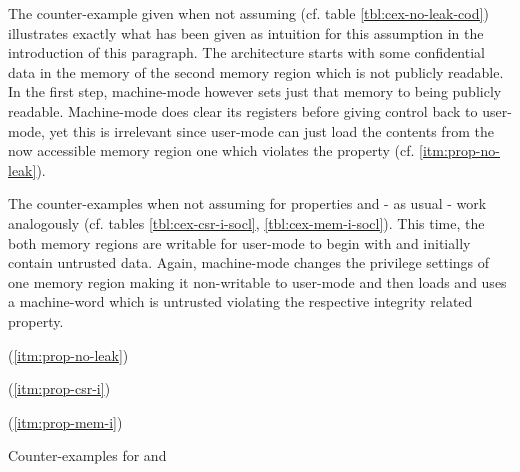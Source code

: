 The counter-example given when not assuming  (cf. table \ref{tbl:cex-no-leak-cod}) illustrates exactly what has been given as intuition for this assumption in the introduction of this paragraph.
The architecture starts with some confidential data in the memory of the second memory region which is not publicly readable.
In the first step, machine-mode however sets just that memory to being publicly readable.
Machine-mode does clear its registers before giving control back to user-mode, yet this is irrelevant since user-mode can just load the contents from the now accessible memory region one which violates the  property (cf. \ref{itm:prop-no-leak}).

The counter-examples when not assuming  for properties  and  - as usual - work analogously (cf. tables \ref{tbl:cex-csr-i-socl}, \ref{tbl:cex-mem-i-socl}).
This time, the both memory regions are writable for user-mode to begin with and initially contain untrusted data.
Again, machine-mode changes the privilege settings of one memory region making it non-writable to user-mode and then loads and uses a machine-word which is untrusted violating the respective integrity related property.

\begin{table}
    \begin{subtable}{\textwidth}
        \centering
        
        \caption{ (\ref{itm:prop-no-leak})}
        \label{tbl:cex-no-leak-cod}
    \end{subtable}

    \begin{subtable}{\textwidth}
        \centering
        
        \caption{ (\ref{itm:prop-csr-i})}
        \label{tbl:cex-csr-i-socl}
    \end{subtable}

    \begin{subtable}{\textwidth}
        \centering
        
        \caption{ (\ref{itm:prop-mem-i})}
        \label{tbl:cex-mem-i-socl}
    \end{subtable}
    \caption{Counter-examples for  and }
\end{table}

